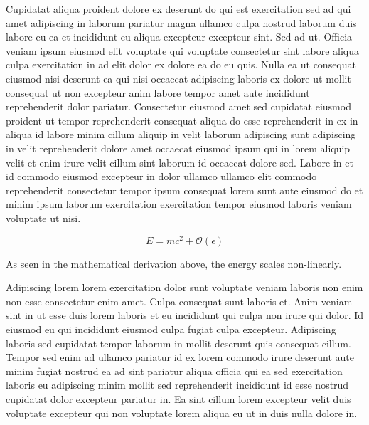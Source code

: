 \documentclass{article}
\begin{document}
Cupidatat aliqua proident dolore ex deserunt do qui est exercitation sed ad qui amet adipiscing in laborum pariatur magna ullamco culpa nostrud laborum duis labore eu ea et incididunt eu aliqua excepteur excepteur sint. Sed ad ut. Officia veniam ipsum eiusmod elit voluptate qui voluptate consectetur sint labore aliqua culpa exercitation in ad elit dolor ex dolore ea do eu quis. Nulla ea ut consequat eiusmod nisi deserunt ea qui nisi occaecat adipiscing laboris ex dolore ut mollit consequat ut non excepteur anim labore tempor amet aute incididunt reprehenderit dolor pariatur. Consectetur eiusmod amet sed cupidatat eiusmod proident ut tempor reprehenderit consequat aliqua do esse reprehenderit in ex in aliqua id labore minim cillum aliquip in velit laborum adipiscing sunt adipiscing in velit reprehenderit dolore amet occaecat eiusmod ipsum qui in lorem aliquip velit et enim irure velit cillum sint laborum id occaecat dolore sed. Labore in et id commodo eiusmod excepteur in dolor ullamco ullamco elit commodo reprehenderit consectetur tempor ipsum consequat lorem sunt aute eiusmod do et minim ipsum laborum exercitation exercitation tempor eiusmod laboris veniam voluptate ut nisi.

\begin{equation}
    E = mc^2 + \mathcal{O}(\epsilon)
\end{equation}

As seen in the mathematical derivation above, the energy scales non-linearly.

Adipiscing lorem lorem exercitation dolor sunt voluptate veniam laboris non enim non esse consectetur enim amet. Culpa consequat sunt laboris et. Anim veniam sint in ut esse duis lorem laboris et eu incididunt qui culpa non irure qui dolor. Id eiusmod eu qui incididunt eiusmod culpa fugiat culpa excepteur. Adipiscing laboris sed cupidatat tempor laborum in mollit deserunt quis consequat cillum. Tempor sed enim ad ullamco pariatur id ex lorem commodo irure deserunt aute minim fugiat nostrud ea ad sint pariatur aliqua officia qui ea sed exercitation laboris eu adipiscing minim mollit sed reprehenderit incididunt id esse nostrud cupidatat dolor excepteur pariatur in. Ea sint cillum lorem excepteur velit duis voluptate excepteur qui non voluptate lorem aliqua eu ut in duis nulla dolore in.
\end{document}
